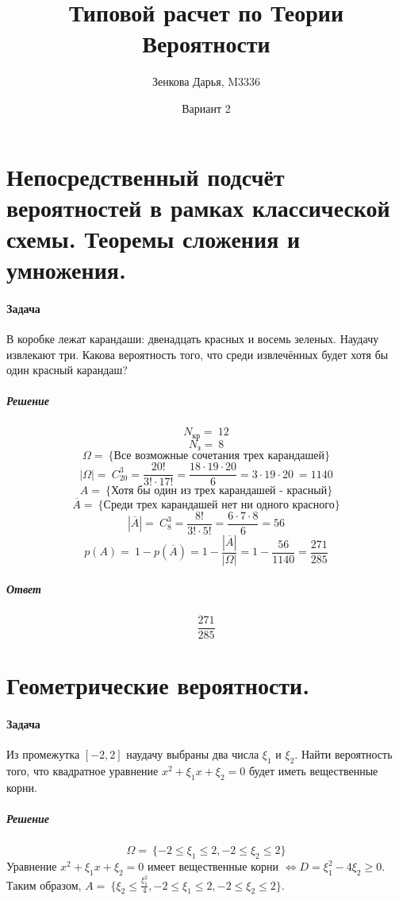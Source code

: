 \documentclass[fleqn, 10pt]{article}
\title{Типовой расчет по Теории Вероятности}
\author{Зенкова Дарья, M3336}
\date{Вариант 2}
\newcommand\abs[1]{\left|#1\right|}
\begin{document}
\maketitle
\newpage
{}

\section{Непосредственный подсчёт вероятностей в рамках классической схемы. Теоремы сложения и умножения.}

\paragraph{Задача}
В коробке лежат карандаши: двенадцать красных и восемь зеленых. Наудачу извлекают три. Какова вероятность того, что среди извлечённых будет хотя бы один красный карандаш?
\subparagraph{Решение}
\[N_{\text{кр}} =\ 12\] 
\[N_{\text{з}} =\ 8\]
\[\Omega =\ \{\text{Все возможные сочетания трех карандашей}\}\]
\[\abs{\Omega} =\ C^3_{20} = \frac{20!}{3!\cdot17!} = \frac{18\cdot19\cdot20}{6} = 3\cdot19\cdot20\ = 1140 \]
\[A =\ \{\text{Хотя бы один из трех карандашей - красный}\} \]
\[\overline{A} =\ \{\text{Среди трех карандашей нет ни одного красного}\} \]
\[\abs{\overline{A}} =\ C^3_{8} = \frac{8!}{3!\cdot5!} = \frac{6\cdot7\cdot8}{6} = 56\]
\[p(A) =\ 1 - p(\overline{A}) = 1 - \frac{\abs{\overline{A}}}{\abs{\Omega}} = 1 - \frac{56}{1140} = \frac{271}{285}\]
\subparagraph{Ответ} \[\frac{271}{285}\]
\newpage

\section{Геометрические вероятности.}
\paragraph{Задача}
Из промежутка \({[{-2}, 2]}\) наудачу выбраны два числа \(\xi_1\) и \(\xi_2\). Найти вероятность того, что квадратное уравнение \(x^2+\xi_1x+\xi_2=0\) будет иметь вещественные корни.
\subparagraph{Решение}
\[\Omega =\ \{{-2}\leq\xi_1\leq2, {-2}\leq\xi_2\leq2\}\]
Уравнение \(x^2+\xi_1x+\xi_2=0\) имеет вещественные корни \(\iff D = \xi_1^2 - 4\xi_2 \geq 0\). \\
Таким образом, \(A = \ \{\xi_2 \leq \frac{\xi_1^2}{4}, {-2}\leq\xi_1\leq2, {-2}\leq\xi_2\leq2\}\).\\
\end{document}
